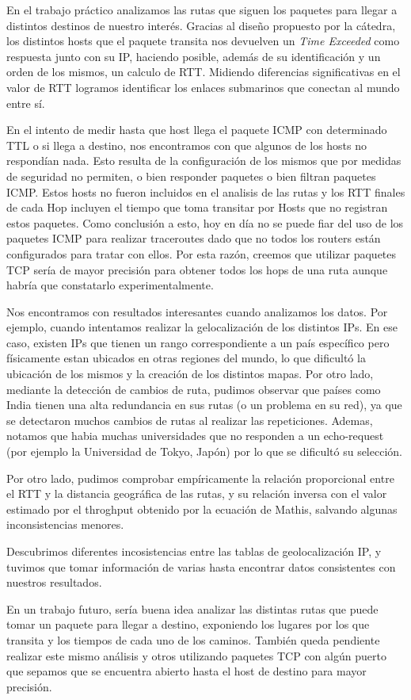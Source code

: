 En el trabajo práctico analizamos las rutas que siguen los paquetes para llegar a distintos destinos de nuestro interés. Gracias al diseño propuesto por la cátedra, los distintos hosts que el paquete transita nos devuelven un \textit{Time Exceeded} como respuesta junto con su IP, haciendo posible, además de su identificación y un orden de los mismos, un calculo de RTT. Midiendo diferencias significativas en el valor de RTT logramos identificar los enlaces submarinos que conectan al mundo entre sí.

En el intento de medir hasta que host llega el paquete ICMP con determinado TTL o si llega a destino, nos encontramos con que algunos de los hosts no respondían nada. Esto resulta de la configuración de los mismos que por medidas de seguridad no permiten, o bien responder paquetes o bien filtran paquetes ICMP. Estos hosts no fueron incluidos en el analisis de las rutas y los RTT finales de cada Hop incluyen el tiempo que toma transitar por Hosts que no registran estos paquetes. Como conclusión a esto, hoy en día no se puede fiar del uso de los paquetes ICMP para realizar traceroutes dado que no todos los routers están configurados para tratar con ellos. Por esta razón, creemos que utilizar paquetes TCP sería de mayor precisión para obtener todos los hops de una ruta aunque habría que constatarlo experimentalmente.

Nos encontramos con resultados interesantes cuando analizamos los datos. Por ejemplo, cuando intentamos realizar la gelocalización de los distintos IPs. En ese caso, existen IPs que tienen un rango correspondiente a un país específico pero físicamente estan ubicados en otras regiones del mundo, lo que dificultó la ubicación de los mismos y la creación de los distintos mapas. Por otro lado, mediante la detección de cambios de ruta, pudimos observar que países como India tienen una alta redundancia en sus rutas (o un problema en su red), ya que se detectaron muchos cambios de rutas al realizar las repeticiones. Ademas, notamos que habia muchas universidades que no responden a un echo-request (por ejemplo la Universidad de Tokyo, Japón) por lo que se dificultó su selección.

Por otro lado, pudimos comprobar empíricamente la relación proporcional entre el RTT y la distancia geográfica de las rutas, y su relación inversa con el valor estimado por el throghput obtenido por la ecuación de Mathis, salvando algunas inconsistencias menores.

Descubrimos diferentes incosistencias entre las tablas de geolocalización IP, y tuvimos que tomar información de varias hasta encontrar datos consistentes con nuestros resultados.

En un trabajo futuro, sería buena idea analizar las distintas rutas que puede tomar un paquete para llegar a destino, exponiendo los lugares por los que transita y los tiempos de cada uno de los caminos. También queda pendiente realizar este mismo análisis y otros utilizando paquetes TCP con algún puerto que sepamos que se encuentra abierto hasta el host de destino para mayor precisión.
